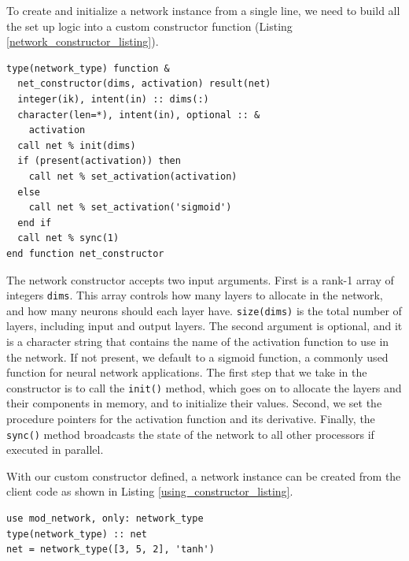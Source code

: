 \documentclass[sigplan, review=false, screen=true, balance=true]{acmart}
\begin{document}
To create and initialize a network instance from a single line, we need to
build all the set up logic into a custom constructor function (Listing
\ref{network_constructor_listing}).

\begin{minipage}{\linewidth}
\begin{lstlisting}[caption={Custom network constructor.}, captionpos=b, label={network_constructor_listing}]
type(network_type) function &
  net_constructor(dims, activation) result(net)
  integer(ik), intent(in) :: dims(:)
  character(len=*), intent(in), optional :: &
    activation
  call net % init(dims)
  if (present(activation)) then
    call net % set_activation(activation)
  else
    call net % set_activation('sigmoid')
  end if
  call net % sync(1)
end function net_constructor
\end{lstlisting}
\end{minipage}

The network constructor accepts two input arguments. First is a rank-1 array of
integers \lstinline{dims}. This array controls how many layers to allocate in
the network, and how many neurons should each layer have. \lstinline{size(dims)}
is the total number of layers, including input and output layers. The second
argument is optional, and it is a character string that contains the name of the
activation function to use in the network. If not present, we default to a
sigmoid function, a commonly used function for neural network applications.
The first step that we take in the constructor is to call the \lstinline{init()} method,
which goes on to allocate the layers and their components in memory, and to
initialize their values. Second, we set the procedure pointers for the activation
function and its derivative. Finally, the \lstinline{sync()} method broadcasts
the state of the network to all other processors if executed in parallel.

With our custom constructor defined, a network instance can be created from the
client code as shown in Listing \ref{using_constructor_listing}.

\begin{minipage}{\linewidth}
\begin{lstlisting}[caption={Creating a network instance in the client code.}, captionpos=b, label={using_constructor_listing}]
use mod_network, only: network_type
type(network_type) :: net
net = network_type([3, 5, 2], 'tanh')
\end{lstlisting}
\end{minipage}
\end{document}
